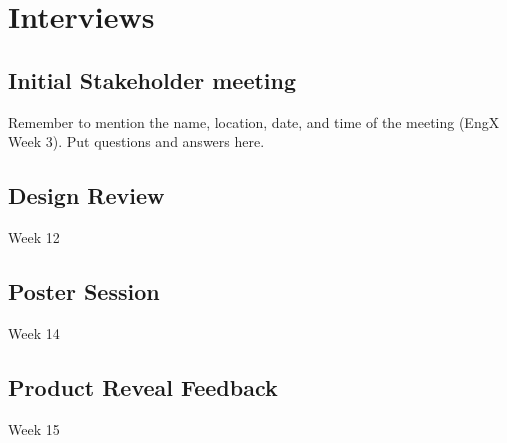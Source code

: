 \chapter{Interviews}\label{cha:interviews}
\section{Initial Stakeholder meeting}\label{sec:init-stak-meet}
Remember to mention the name, location, date, and time of the meeting (EngX Week 3).
Put questions and answers here.

\section{Design Review}\label{sec:design-review}
Week 12

\section{Poster Session}\label{sec:poster-session}
Week 14

\section{Product Reveal Feedback}\label{sec:prod-reve-feedb}
Week 15

